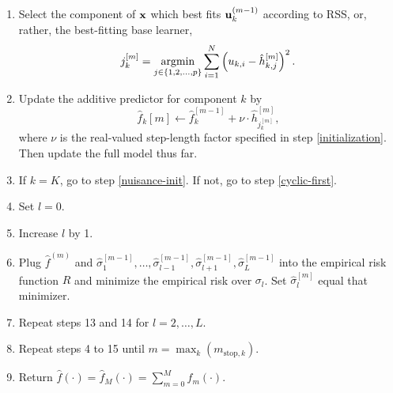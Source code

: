 \begin{algorithm}
\begin{enumerate}
    \item Select the component of $\mathbf{x}$ which best fits $\mathbf{u}^{(m-1)}_k$ according to RSS, or, rather, the best-fitting base learner,
        \begin{equation}
            j_k^{[m]}=\operatorname*{argmin}_{j\in\{1,2,\ldots,p\}}\sum_{i=1}^N \left(u_{k,i}-\hat{h}_{k,j}^{[m]}\right)^2.
        \end{equation}
    \item\label{cyclic-last} Update the additive predictor for component $k$ by
        \begin{equation}
            \hat{f}_k{[m]}\gets\hat{f}_k^{[m-1]}+\nu\cdot\hat{h}_{j_k^{[m]}}^{[m]},
        \end{equation}
        where $\nu$ is the real-valued step-length factor specified in step \ref{initialization}. Then update the full model thus far.
    \item\label{repeat-step} If $k=K$, go to step \ref{nuisance-init}. If not, go to step \ref{cyclic-first}.
    \item\label{nuisance-init} Set $l=0$.
    \item\label{nuisance-first} Increase $l$ by 1.
    \item Plug $\hat{f}^{(m)}$ and $\hat{\sigma}_1^{[m-1]},\ldots,\hat{\sigma}_{l-1}^{[m-1]},\hat{\sigma}_{l+1}^{[m-1]},\hat{\sigma}_{L}^{[m-1]}$ into the empirical risk function $R$ and minimize the empirical risk over $\sigma_l$. Set $\hat{\sigma}_l^{[m]}$ equal that minimizer.
    \item Repeat steps 13 and 14 for $l=2,\ldots,L$.
    \item Repeat steps 4 to 15 until $m=\max_k(m_{\text{stop},k})$.
    \item Return $\hat{f}(\cdot)=\hat{f}_M(\cdot)=\sum_{m=0}^Mf_m(\cdot)$.
\end{enumerate}
\end{algorithm}

